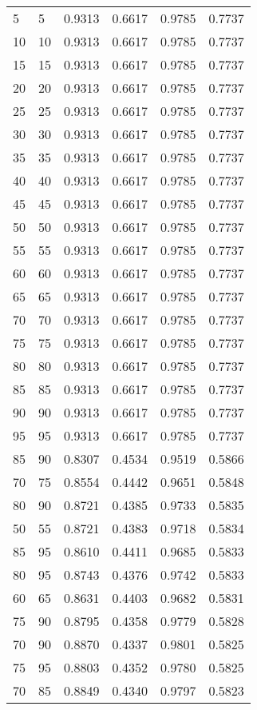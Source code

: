 \begin{center}
\begin{longtable}{|l|l|l|l|l|l|}
5  & 5  & 0.9313 & 0.6617 & 0.9785 & 0.7737 \\
10 & 10 & 0.9313 & 0.6617 & 0.9785 & 0.7737 \\
15 & 15 & 0.9313 & 0.6617 & 0.9785 & 0.7737 \\
20 & 20 & 0.9313 & 0.6617 & 0.9785 & 0.7737 \\
25 & 25 & 0.9313 & 0.6617 & 0.9785 & 0.7737 \\
30 & 30 & 0.9313 & 0.6617 & 0.9785 & 0.7737 \\
35 & 35 & 0.9313 & 0.6617 & 0.9785 & 0.7737 \\
40 & 40 & 0.9313 & 0.6617 & 0.9785 & 0.7737 \\
45 & 45 & 0.9313 & 0.6617 & 0.9785 & 0.7737 \\
50 & 50 & 0.9313 & 0.6617 & 0.9785 & 0.7737 \\
55 & 55 & 0.9313 & 0.6617 & 0.9785 & 0.7737 \\
60 & 60 & 0.9313 & 0.6617 & 0.9785 & 0.7737 \\
65 & 65 & 0.9313 & 0.6617 & 0.9785 & 0.7737 \\
70 & 70 & 0.9313 & 0.6617 & 0.9785 & 0.7737 \\
75 & 75 & 0.9313 & 0.6617 & 0.9785 & 0.7737 \\
80 & 80 & 0.9313 & 0.6617 & 0.9785 & 0.7737 \\
85 & 85 & 0.9313 & 0.6617 & 0.9785 & 0.7737 \\
90 & 90 & 0.9313 & 0.6617 & 0.9785 & 0.7737 \\
95 & 95 & 0.9313 & 0.6617 & 0.9785 & 0.7737 \\
85 & 90 & 0.8307 & 0.4534 & 0.9519 & 0.5866 \\
70 & 75 & 0.8554 & 0.4442 & 0.9651 & 0.5848 \\
80 & 90 & 0.8721 & 0.4385 & 0.9733 & 0.5835 \\
50 & 55 & 0.8721 & 0.4383 & 0.9718 & 0.5834 \\
85 & 95 & 0.8610 & 0.4411 & 0.9685 & 0.5833 \\
80 & 95 & 0.8743 & 0.4376 & 0.9742 & 0.5833 \\
60 & 65 & 0.8631 & 0.4403 & 0.9682 & 0.5831 \\
75 & 90 & 0.8795 & 0.4358 & 0.9779 & 0.5828 \\
70 & 90 & 0.8870 & 0.4337 & 0.9801 & 0.5825 \\
75 & 95 & 0.8803 & 0.4352 & 0.9780 & 0.5825 \\
70 & 85 & 0.8849 & 0.4340 & 0.9797 & 0.5823 \\

\end{longtable}
\end{center}
